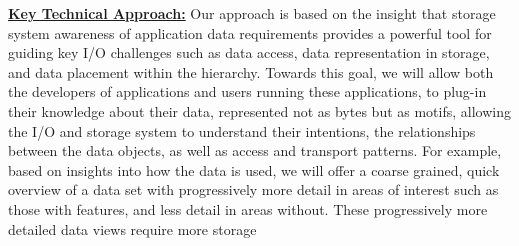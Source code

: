 \documentclass[11pt,letterpaper]{article}
\newcommand{\TODO}[1]{\textcolor{red}{ TO DO: #1 }}
\newcommand{\TODO}[1]{}
\begin{document}
%  
% 


\underline{\textbf{Key Technical Approach:}}
Our  approach is based on the insight that storage system awareness
of application data requirements provides a powerful tool for guiding key
I/O challenges such as data access,  data representation in
storage, and data
placement within the hierarchy.
Towards this goal, we will allow both the developers of applications
and users running these applications, 
 to plug-in their knowledge 
about their data, represented not as bytes but as motifs, allowing the I/O and 
storage system to understand their
intentions, the relationships between the data objects, as well as access
and transport patterns. 
%
%
 For example, based on insights into how the data is used,
we will offer a coarse grained, quick overview of a data set with progressively more detail in 
areas of interest such as those with features, and less detail in areas
without. These progressively more detailed data views require more storage
\end{document}
